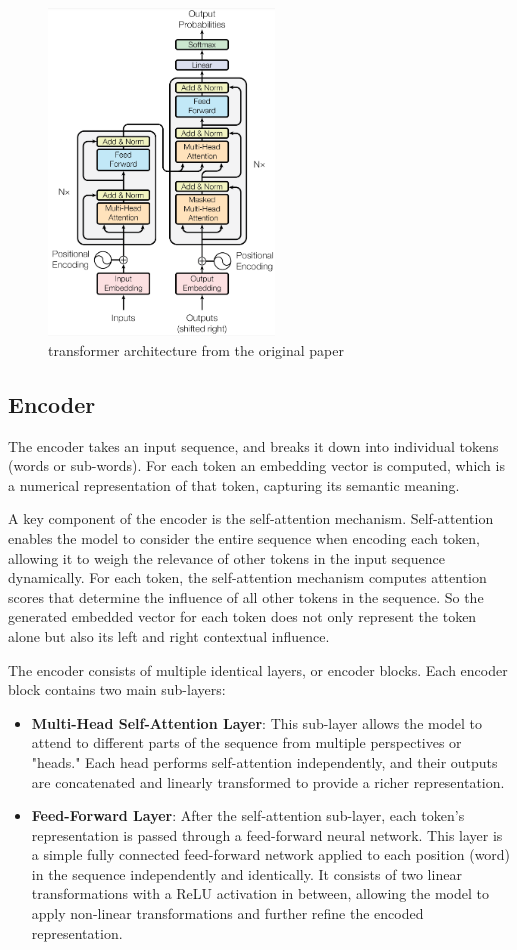 \begin{figure}[h]
    
    \centering
    \includegraphics[width=6cm]{ressources/images/Transformer.png}
    \caption{transformer architecture from the original paper}
    \end{figure}
\subsection{Encoder}
The encoder takes an input sequence, and breaks it down into individual tokens (words or sub-words).
For each token an embedding vector is computed, which is a numerical representation of that token, capturing its semantic meaning.

A key component of the encoder is the self-attention mechanism. Self-attention enables the model to consider the entire sequence when encoding each token, allowing it to weigh the relevance of other tokens in the input sequence dynamically. For each token, the self-attention mechanism computes attention scores that determine the influence of all other tokens in the sequence. So the generated embedded vector for each token does not only represent the token alone but also its left and right contextual influence.


The encoder consists of multiple identical layers, or encoder blocks. Each encoder block contains two main sub-layers:

\begin{itemize}
    \item \textbf{Multi-Head Self-Attention Layer}: This sub-layer allows the model to attend to different parts of the sequence from multiple perspectives or "heads." Each head performs self-attention independently, and their outputs are concatenated and linearly transformed to provide a richer representation.

    \item \textbf{Feed-Forward Layer}: After the self-attention sub-layer, each token's representation is passed through a feed-forward neural network. This layer is a simple fully connected feed-forward network applied to each position (word) in the sequence independently and identically. It consists of two linear transformations with a ReLU activation in between, allowing the model to apply non-linear transformations and further refine the encoded representation.
\end{itemize}

